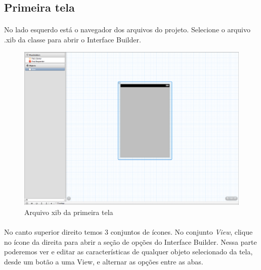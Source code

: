 \documentclass[a4paper,12pt,brazil,doubleside]{book}
\begin{document}
\bigskip

\subsection{Primeira tela}

\paragraph{}No lado esquerdo está o navegador dos arquivos do projeto. Selecione o arquivo .xib da classe para abrir o Interface Builder.

\begin{figure}[h]
  \centering
  \includegraphics[totalheight=0.35\textheight]{figuras/1/xib.png}
  \caption{Arquivo xib da primeira tela}
  \label{fig:a}
\end{figure}

\bigskip

\paragraph{}No canto superior direito temos 3 conjuntos de ícones. No conjunto \emph{View}, clique no ícone da direita para abrir a seção de opções do Interface Builder. Nessa parte poderemos ver e editar as características de qualquer objeto selecionado da tela, desde um botão a uma View, e alternar as opções entre as abas.
\end{document}
